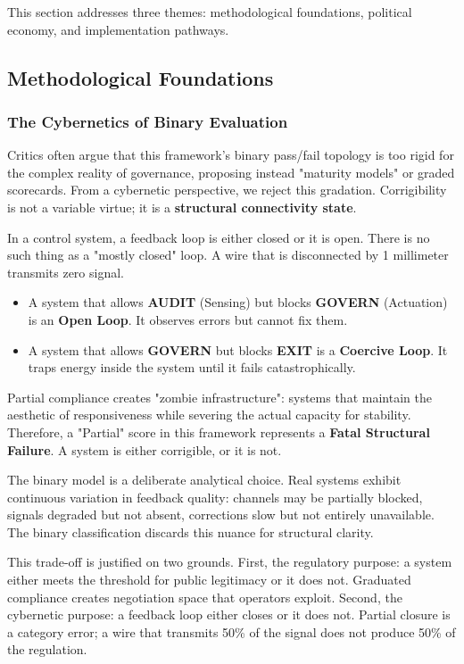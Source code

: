 \documentclass{article}
\begin{document}
This section addresses three themes: methodological foundations, political economy, and implementation pathways.

\subsection{Methodological Foundations}
\label{subsec:methodology}

\subsubsection{The Cybernetics of Binary Evaluation}

Critics often argue that this framework's binary pass/fail topology is too rigid for the complex reality of governance, proposing instead "maturity models" or graded scorecards. From a cybernetic perspective, we reject this gradation. Corrigibility is not a variable virtue; it is a \textbf{structural connectivity state}.

In a control system, a feedback loop is either closed or it is open. There is no such thing as a "mostly closed" loop. A wire that is disconnected by 1 millimeter transmits zero signal.

\begin{itemize}
    \item A system that allows \textbf{AUDIT} (Sensing) but blocks \textbf{GOVERN} (Actuation) is an \textbf{Open Loop}. It observes errors but cannot fix them.
    \item A system that allows \textbf{GOVERN} but blocks \textbf{EXIT} is a \textbf{Coercive Loop}. It traps energy inside the system until it fails catastrophically.
\end{itemize}

Partial compliance creates "zombie infrastructure": systems that maintain the aesthetic of responsiveness while severing the actual capacity for stability. Therefore, a "Partial" score in this framework represents a \textbf{Fatal Structural Failure}. A system is either corrigible, or it is not.

The binary model is a deliberate analytical choice. Real systems exhibit continuous variation in feedback quality: channels may be partially blocked, signals degraded but not absent, corrections slow but not entirely unavailable. The binary classification discards this nuance for structural clarity.

This trade-off is justified on two grounds. First, the regulatory purpose: a system either meets the threshold for public legitimacy or it does not. Graduated compliance creates negotiation space that operators exploit. Second, the cybernetic purpose: a feedback loop either closes or it does not. Partial closure is a category error; a wire that transmits 50\% of the signal does not produce 50\% of the regulation.
\end{document}
